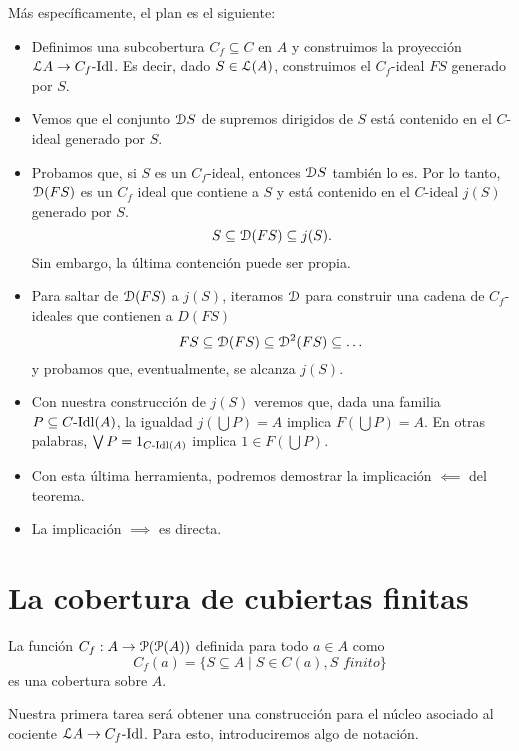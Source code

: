 Más específicamente, el plan es el siguiente:
\begin{itemize}
    \item
    Definimos una subcobertura $C_f\subseteq C$ en $A$ y
    construimos la proyección $\cal LA\to C_f\Idl$.
    Es decir, dado $S\in\cal L(A)$,
    construimos el $C_f$-ideal $FS$ generado por $S$.
    \item 
    Vemos que el conjunto $\cal DS$ de supremos dirigidos
    de $S$ está contenido en el $C$-ideal generado por $S$.
    \item
    Probamos que, si $S$ es un $C_f$-ideal, entonces
    $\cal DS$ también lo es.
    Por lo tanto, $\cal D(FS)$ es un $C_f$ ideal que
    contiene a $S$ y está contenido en el $C$-ideal $j(S)$
    generado por $S$.
    \[
        S\subseteq \cal D(FS) \subseteq j(S)
    .\]
    Sin embargo, la última contención puede ser propia.
    \item
    Para saltar de $\cal D(FS)$ a $j(S)$,
    iteramos $\cal D$ para construir una
    cadena de $C_f$-ideales que contienen a $D(FS)$
    \[
        FS\subseteq \cal D(FS) \subseteq \cal D^2(FS)
        \subseteq \dots
    \]
    y probamos que, eventualmente, se alcanza $j(S)$.
    \item
    Con nuestra construcción de $j(S)$ veremos
    que, dada una familia $P\subseteq C\Idl(A)$,
    la igualdad
    $j(\bigcup P)=A$ implica $F(\bigcup P)=A$.
    En otras palabras,
    $\Sup P = 1_{C\Idl(A)}$ implica $1\in F(\bigcup P)$.
    \item
    Con esta última herramienta, podremos demostrar
    la implicación $\impliedby$ del teorema.
    \item
    La implicación $\implies$ es directa.
\end{itemize}

\section{La cobertura de cubiertas finitas}

\begin{lemma}
La función $C_f:A\to\cal P(\cal P(A))$
definida para todo $a\in A$ como
\[C_f(a)=\{S\subseteq A\mid S\in C(a), S\textit{ finito}\}\]
es una cobertura sobre $A$.
\end{lemma}

Nuestra primera tarea será obtener una construcción para
el núcleo asociado al cociente $\cal LA\to C_f\Idl$.
Para esto, introduciremos algo de notación.

